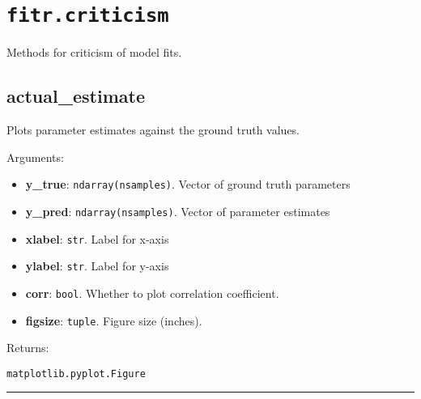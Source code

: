 \section{\texorpdfstring{\texttt{fitr.criticism}}{fitr.criticism}}\label{fitr.criticism}

Methods for criticism of model fits.

\subsection{actual\_estimate}\label{actual_estimate}

\begin{Shaded}
\begin{Highlighting}[]
\OperatorTok{=}\OperatorTok{=}\OperatorTok{=}\OperatorTok{=}\NormalTok{)}
\end{Highlighting}
\end{Shaded}

Plots parameter estimates against the ground truth values.

Arguments:

\begin{itemize}
\tightlist
\item
  \textbf{y\_true}: \texttt{ndarray(nsamples)}. Vector of ground truth
  parameters
\item
  \textbf{y\_pred}: \texttt{ndarray(nsamples)}. Vector of parameter
  estimates
\item
  \textbf{xlabel}: \texttt{str}. Label for x-axis
\item
  \textbf{ylabel}: \texttt{str}. Label for y-axis
\item
  \textbf{corr}: \texttt{bool}. Whether to plot correlation coefficient.
\item
  \textbf{figsize}: \texttt{tuple}. Figure size (inches).
\end{itemize}

Returns:

\texttt{matplotlib.pyplot.Figure}

\begin{center}\rule{0.5\linewidth}{\linethickness}\end{center}
